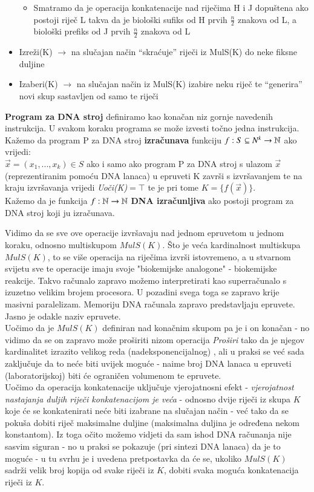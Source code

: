 \documentclass[a4paper,oneside,12pt]{memoir} %
\begin{document}
\begin{spacing}{1.5}
\begin{defn}
\begin{itemize}
\begin{itemize}
                \item Smatramo da je operacija konkatenacije nad riječima H i J dopuštena ako postoji riječ L takva da je biološki sufiks od H prvih $\frac{n}{2}$  znakova od L, a biološki prefiks od J prvih $\frac{n}{2}$ znakova od L
            \end{itemize}
    \item Izreži(K) $\to$ na slučajan način “skraćuje” riječi iz MulS(K) do neke fiksne duljine
    \item Izaberi(K) $\to$ na slučajan način iz MulS(K) izabire neku riječ te “generira” novi skup sastavljen od samo te riječi

    \end{itemize}
    \textbf{Program za DNA stroj} definiramo kao konačan niz gornje navedenih instrukcija. U svakom koraku programa se može izvesti točno jedna instrukcija.  Kažemo da program P za DNA stroj \textbf{izračunava} funkciju $f:S \subseteq N^k \to \mathbb{N}$ ako vrijedi:\\
$\vec{x}=(x_1,...,x_k) \in S$ ako i samo ako program P za DNA stroj s ulazom  $\vec{x}$ (reprezentiranim pomoću DNA lanaca) u epruveti K završi s izvršavanjem te na kraju izvršavanja vrijedi \textit{Uoči(K)}$=\top$ te je pri tome $K=\{f(\vec{x})\}$.\\
Kažemo da je funkcija $f:\mathbb{N} \to \mathbb{N}$ \textbf{DNA izračunljiva} ako postoji program za DNA stroj koji ju izračunava.
\end{defn}
\begin{rem}
Vidimo da se sve ove operacije izvršavaju nad jednom epruvetom u jednom koraku, odnosno multiskupom $MulS(K)$. Što je veća kardinalnost multiskupa $MulS(K)$, to se više operacija na riječima izvrši istovremeno, a u stvarnom svijetu sve te operacije imaju svoje "biokemijske analogone" - biokemijske reakcije. Takvo računalo zapravo možemo interpretirati kao superračunalo s izuzetno velikim brojem procesora. U pozadini svega toga se zapravo krije masivni paralelizam. Memoriju DNA računala zapravo predstavljaju epruvete. Jasno je odakle naziv epruvete.\\
Uočimo da je $MulS(K)$ definiran nad konačnim skupom pa je i on konačan - no vidimo da se on zapravo može proširiti nizom operacija \textit{Proširi} tako da je njegov kardinalitet izrazito velikog reda (nadeksponencijalnog) , ali u praksi se već sada zaključuje da to neće biti uvijek moguće - naime broj DNA lanaca u epruveti (laboratorijskoj) biti će ograničen volumenom te epruvete.\\
Uočimo da operacija konkatenacije uključuje vjerojatnosni efekt - \textit{vjerojatnost nastajanja duljih riječi konkatenacijom je veća} - odnosno dvije riječi iz skupa $K$ koje će se konkatenirati neće biti izabrane na slučajan način - već tako da se pokuša dobiti riječ maksimalne duljine (maksimalna duljina je određena nekom konstantom). Iz toga očito možemo vidjeti da sam ishod DNA računanja nije sasvim siguran  - no u praksi se pokazuje (pri sintezi DNA lanaca) da je to moguće - u tu svrhu je i uvedena pretpostavka da će  se, ukoliko $MulS(K)$ sadrži velik broj kopija od svake riječi iz $K$, dobiti svaka moguća konkatenacija riječi iz $K$.
\end{rem}

\end{spacing}
\end{document}
